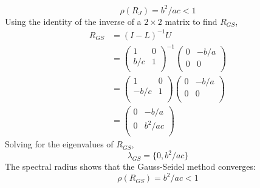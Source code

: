 \documentclass[11pt]{article} %
\begin{document}
\begin{equation}
\boxed{\rho(R_J) = b^2/ac < 1}
\end{equation}
Using the identity of the inverse of a $2 \times 2$ matrix to find $R_{GS}$,
\begin{equation}
\begin{split}
R_{GS}& =(I-L)^{-1} U \\
& = \left ( \begin{array}{rr}
1 &0 \\
b/c & 1 \\
\end{array} \right )^{-1}
\left ( \begin{array}{rr}
0 & -b/a \\
0 & 0 \\
\end{array} \right )\\
&= \left ( \begin{array}{rr}
1 &0\\
-b/c & 1 \\
\end{array} \right )
\left ( \begin{array}{rr}
0 & -b/a \\
0 & 0 \\
\end{array} \right )\\
&=\left ( \begin{array}{rr}
0 & -b/a \\
0 & b^2/ac \\
\end{array} \right )
\end{split}
\end{equation}
Solving for the eigenvalues of $R_{GS}$,
\begin{equation}
\lambda_{GS} = \{0, b^2/ac \}
\end{equation}
The spectral radius shows that the Gauss-Seidel method converges:
\begin{equation}
\boxed{\rho(R_{GS}) = b^2/ac < 1}
\end{equation}
\end{document}
